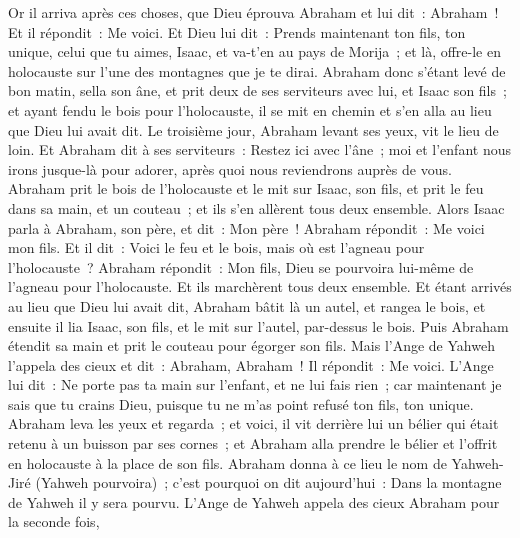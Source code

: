 \begin{multicols}{2}
\VerseOne{}Or il arriva après ces choses, que Dieu éprouva Abraham et lui dit~: Abraham~! Et il répondit~: Me voici.
Et Dieu lui dit~: Prends maintenant ton fils, ton unique, celui que tu aimes, Isaac, et va-t'en au pays de Morija~; et là, offre-le en holocauste sur l'une des montagnes que je te dirai.
Abraham donc s'étant levé de bon matin, sella son âne, et prit deux de ses serviteurs avec lui, et Isaac son fils~; et ayant fendu le bois pour l'holocauste, il se mit en chemin et s'en alla au lieu que Dieu lui avait dit.
Le troisième jour, Abraham levant ses yeux, vit le lieu de loin.
Et Abraham dit à ses serviteurs~: Restez ici avec l'âne~; moi et l'enfant nous irons jusque-là pour adorer, après quoi nous reviendrons auprès de vous.
Abraham prit le bois de l'holocauste et le mit sur Isaac, son fils, et prit le feu dans sa main, et un couteau~; et ils s'en allèrent tous deux ensemble.
Alors Isaac parla à Abraham, son père, et dit~: Mon père~! Abraham répondit~: Me voici mon fils. Et il dit~: Voici le feu et le bois, mais où est l'agneau pour l'holocauste~?
Abraham répondit~: Mon fils, Dieu se pourvoira lui-même de l'agneau pour l'holocauste. Et ils marchèrent tous deux ensemble.
Et étant arrivés au lieu que Dieu lui avait dit, Abraham bâtit là un autel, et rangea le bois, et ensuite il lia Isaac, son fils, et le mit sur l'autel, par-dessus le bois.
Puis Abraham étendit sa main et prit le couteau pour égorger son fils.
Mais l'Ange de Yahweh l'appela des cieux et dit~: Abraham, Abraham~! Il répondit~: Me voici.
L'Ange lui dit~: Ne porte pas ta main sur l'enfant, et ne lui fais rien~; car maintenant je sais que tu crains Dieu, puisque tu ne m'as point refusé ton fils, ton unique.
Abraham leva les yeux et regarda~; et voici, il vit derrière lui un bélier qui était retenu à un buisson par ses cornes~; et Abraham alla prendre le bélier et l'offrit en holocauste à la place de son fils.
Abraham donna à ce lieu le nom de Yahweh-Jiré (Yahweh pourvoira)~; c'est pourquoi on dit aujourd'hui~: Dans la montagne de Yahweh il y sera pourvu.
L'Ange de Yahweh appela des cieux Abraham pour la seconde fois,

\end{multicols}
